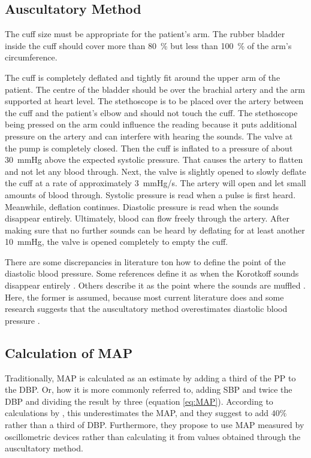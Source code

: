 \subsection{Auscultatory Method}
The cuff size must be appropriate for the patient's arm. The rubber bladder inside the cuff should cover more than \SI{80}{\%} but less than \SI{100}{\%} of the arm's circumference.

The cuff is completely deflated and tightly fit around the upper arm of the patient. The centre of the bladder should be over the brachial artery and the arm supported at heart level. The stethoscope is to be placed over the artery between the cuff and the patient's elbow and should not touch the cuff. The stethoscope being pressed on the arm could influence the reading because it puts additional pressure on the artery and can interfere with hearing the sounds.
The valve at the pump is completely closed. Then the cuff is inflated to a pressure of about \SI{30}{\mmHg} above the expected systolic pressure. That causes the artery to flatten and not let any blood through. Next, the valve is slightly opened to slowly deflate the cuff at a rate of approximately \SI{3}{\mmHg/\second}. The artery will open and let small amounts of blood through. Systolic pressure is read when a pulse is first heard. Meanwhile, deflation continues. Diastolic pressure is read when the sounds disappear entirely. Ultimately, blood can flow freely through the artery. After making sure that no further sounds can be heard by deflating for at least another \SI{10}{\mmHg}, the valve is opened completely to empty the cuff. \citep{Lloyd2018, Reeves1995}

There are some discrepancies in literature ton how to define the point of the diastolic blood pressure. Some references define it as when the Korotkoff sounds disappear entirely \citep{Lloyd2018, Reeves1995}. Others describe it as the point where the sounds are muffled \citep{Boron2012}. Here, the former is assumed, because most current literature does and some research suggests that the auscultatory method overestimates diastolic blood pressure \citep{Chandrasekhar2019}.

\subsection{Calculation of MAP}
Traditionally, MAP is calculated as an estimate by adding a third of the PP to the DBP. Or, how it is more commonly referred to, adding SBP and twice the DBP and dividing the result by three (equation \ref{eq:MAP}). According to calculations by \cite{Bos2007}, this underestimates the MAP, and they suggest to add $40\%$ rather than a third of DBP. Furthermore, they propose to use MAP measured by oscillometric devices rather than calculating it from values obtained through the auscultatory method. 

